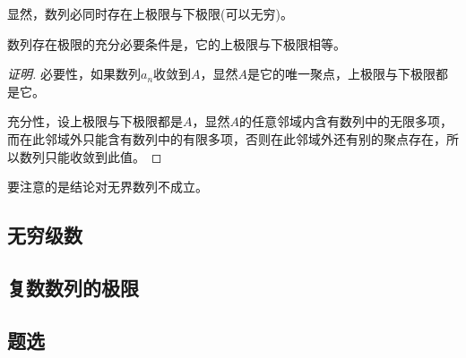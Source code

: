 显然，数列必同时存在上极限与下极限(可以无穷)。

\begin{theorem}
数列存在极限的充分必要条件是，它的上极限与下极限相等。  
\end{theorem}

\begin{proof}[证明]
  必要性，如果数列$a_n$收敛到$A$，显然$A$是它的唯一聚点，上极限与下极限都是它。

  充分性，设上极限与下极限都是$A$，显然$A$的任意邻域内含有数列中的无限多项，而在此邻域外只能含有数列中的有限多项，否则在此邻域外还有别的聚点存在，所以数列只能收敛到此值。
\end{proof}

要注意的是结论对无界数列不成立。

\subsection{无穷级数}
\label{sec:infinite-series}

\subsection{复数数列的极限}
\label{sec:limit-of-complex-number-sequence}

\subsection{题选}
\label{sec:exercises-for-number-sequence-limit}


